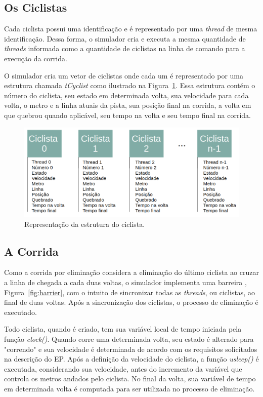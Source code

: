 \documentclass[12pt]{article}
\begin{document}
\subsection{Os Ciclistas}
\label{subsec:os-ciclistas}

Cada ciclista possui uma identificação e é representado por uma \textit{thread} de mesma identificação. Dessa forma, o simulador cria e executa a mesma quantidade de \textit{threads} informada como a quantidade de ciclistas na linha de comando para a execução da corrida.

O simulador cria um vetor de ciclistas onde cada um é representado por uma estrutura chamada \textit{tCyclist} como ilustrado na Figura~\ref{fig:cyclist}. Essa estrutura contém o número do ciclista, seu estado em determinada volta, sua velocidade para cada volta, o metro e a linha atuais da pista, sua posição final na corrida, a volta em que quebrou quando aplicável, seu tempo na volta e seu tempo final na corrida.

\begin{figure}[H]
	\centering
	\includegraphics[width=.9\textwidth]{cyclist.png}
	\caption{Representação da estrutura do ciclista.}
	\label{fig:cyclist}
\end{figure}


\subsection{A Corrida}

Como a corrida por eliminação considera a eliminação do último ciclista ao cruzar a linha de chegada a cada duas voltas, o simulador implementa uma barreira \cite{ibm:20}, Figura~\ref{fig:barrier}, com o intuito de sincronizar todas as \textit{threads}, ou ciclistas, ao final de duas voltas. Após a sincronização dos ciclistas, o processo de eliminação é executado.

Todo ciclista, quando é criado, tem sua variável local de tempo iniciada pela função \textit{clock()}. Quando corre uma determinada volta, seu estado é alterado para "correndo" e sua velocidade é determinada de acordo com os requisitos solicitados na descrição do EP. Após  a definição da velocidade do ciclista, a função \textit{usleep()} é executada, considerando sua velocidade, antes do incremento da variável que controla os metros andados pelo ciclista. No final da volta, sua variável de tempo em determinada volta é computada para ser utilizada no processo de eliminação.
\end{document}
